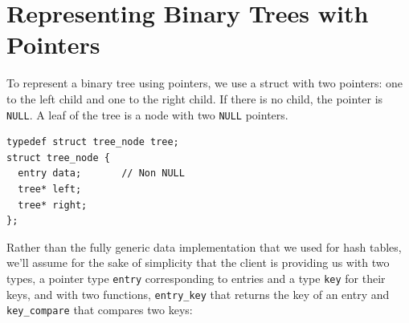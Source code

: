 

\section{Representing Binary Trees with Pointers}
\label{sec:bst:tree_structure}

To represent a binary tree using pointers, we use a struct with
two pointers: one to the left child and one to the
right child.  If there is no child, the pointer is \lstinline'NULL'. A leaf
of the tree is a node with two \lstinline'NULL' pointers.

\begin{lstlisting}[language={[C0]C}]
typedef struct tree_node tree;
struct tree_node {
  entry data;       // Non NULL
  tree* left;
  tree* right;
};
\end{lstlisting}
Rather than the fully generic data implementation that we used for
hash tables, we'll assume for the sake of simplicity that the client
is providing us with two types, a pointer type \lstinline'entry'
corresponding to entries and a type \lstinline'key' for their keys,
and with two functions, \lstinline'entry_key' that returns the key of
an entry and \lstinline'key_compare' that compares two keys:

